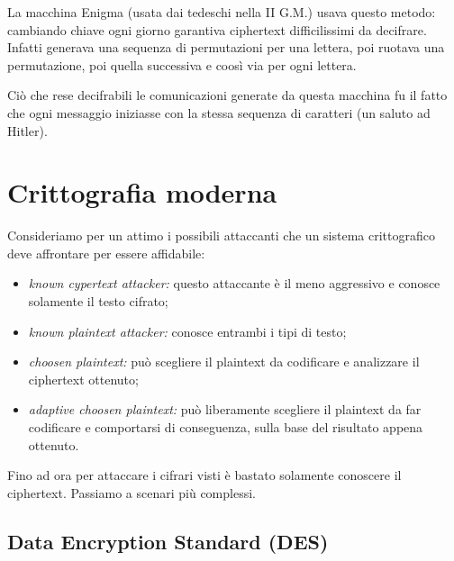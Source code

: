 \documentclass[a4paper, 11pt]{article}
\begin{document}
	La macchina Enigma (usata dai tedeschi nella II G.M.) usava questo metodo: cambiando chiave ogni giorno garantiva ciphertext difficilissimi da decifrare. Infatti generava una sequenza di permutazioni per una lettera, poi ruotava una permutazione, poi quella successiva e coosì via per ogni lettera.
	
	Ciò che rese decifrabili le comunicazioni generate da questa macchina fu il fatto che ogni messaggio iniziasse con la stessa sequenza di caratteri (un saluto ad Hitler).
	
	\section{Crittografia moderna}
	Consideriamo per un attimo i possibili attaccanti che un sistema crittografico deve affrontare per essere affidabile:
	\begin{itemize}
		\item \textit{known cypertext attacker:} questo attaccante è il meno aggressivo e conosce solamente il testo cifrato;
		
		\item \textit{known plaintext attacker:} conosce entrambi i tipi di testo;
		
		\item \textit{choosen plaintext:} può scegliere il plaintext da codificare e analizzare il ciphertext ottenuto;
		
		\item \textit{adaptive choosen plaintext:} può liberamente scegliere il plaintext da far codificare e comportarsi di conseguenza, sulla base del risultato appena ottenuto.
	\end{itemize}
	
	Fino ad ora per attaccare i cifrari visti è bastato solamente conoscere il ciphertext. Passiamo a scenari più complessi.
	
	\subsection{Data Encryption Standard (DES)}
	
	
	
	
\end{document}
